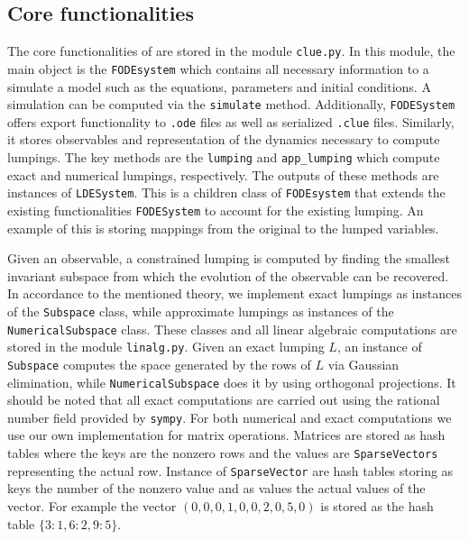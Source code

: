 
\subsection{Core functionalities}
The core functionalities of \ToolName are stored in the module \texttt{clue.py}.
In this module, the main object is the \texttt{FODEsystem} which contains all necessary information to a simulate a model such as the equations, parameters and initial conditions. 
A simulation can be computed via the \texttt{simulate} method.
Additionally, \texttt{FODESystem} offers export functionality to \texttt{.ode} files as well as serialized \texttt{.clue} files.
Similarly, it stores observables and representation of the dynamics necessary to compute lumpings. 
The key methods are the \texttt{lumping} and \texttt{app\_lumping} which compute exact and numerical lumpings,  respectively. 
The outputs of these methods are instances of \texttt{LDESystem}. 
This is a children class of \texttt{FODEsystem} that extends the existing functionalities \texttt{FODESystem}  to account for the existing lumping. 
An example of this is storing mappings from the original to the lumped variables.

Given an observable, a constrained lumping is computed by finding the smallest invariant subspace from which the evolution of the observable can be recovered. 
In accordance to the mentioned theory, we implement exact lumpings as instances of the \texttt{Subspace} class, while approximate lumpings as instances of the \texttt{NumericalSubspace} class.
These classes and all linear algebraic computations are stored in the module \texttt{linalg.py}.
Given an exact lumping $L$, an instance of \texttt{Subspace} computes the space generated by the rows of $L$ via Gaussian elimination, while \texttt{NumericalSubspace} does it by using orthogonal projections.
It should be noted that all exact computations are carried out using the rational number field provided by \texttt{sympy}.
For both numerical and exact computations we use our own implementation for matrix operations.
Matrices are stored as hash tables where the keys are the nonzero rows and the values are \texttt{SparseVectors} representing the actual row.
Instance of \texttt{SparseVector}  are hash tables storing as keys the number of the nonzero value and as values the actual values of the vector.
For example the vector $(0,0,0,1,0,0,2,0,5,0)$ is stored as the hash table $\{ 3:1, 6:2, 9:5\}$.

